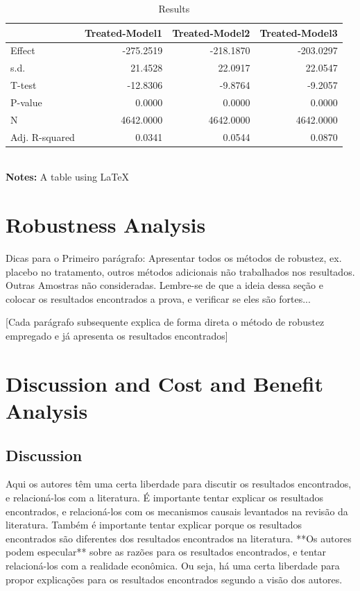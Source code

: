 \documentclass[a4paper]{article}
\begin{document}
\begin{table}[h]
\centering
      \caption{Results}
      \begin{tabular}{lrrr}
            \toprule
             & Treated-Model1 & Treated-Model2 & Treated-Model3 \\
             \midrule
             Effect & -275.2519 & -218.1870 & -203.0297 \\
             s.d. & 21.4528 & 22.0917 & 22.0547 \\
             T-test & -12.8306 & -9.8764 & -9.2057 \\
             P-value & 0.0000 & 0.0000 & 0.0000 \\
             N & 4642.0000 & 4642.0000 & 4642.0000 \\
             Adj. R-squared & 0.0341 & 0.0544 & 0.0870 \\
             \bottomrule
      \end{tabular} \\
\textbf{Notes:} A table using LaTeX
\end{table}


\section{Robustness Analysis}


Dicas para o Primeiro parágrafo: Apresentar todos os métodos de robustez, ex. placebo no tratamento, outros métodos adicionais não trabalhados nos resultados. Outras Amostras não consideradas. Lembre-se de que a ideia dessa seção e colocar os resultados encontrados a prova, e verificar se eles são fortes...

[Cada parágrafo subsequente explica de forma direta o método de robustez empregado e já apresenta os resultados encontrados]

\section{Discussion and Cost and Benefit Analysis}

\subsection{Discussion}

Aqui os autores têm uma certa liberdade para discutir os resultados encontrados, e relacioná-los com a literatura. É importante tentar explicar os resultados encontrados, e relacioná-los com os mecanismos causais levantados na revisão da literatura. Também é importante tentar explicar porque os resultados encontrados são diferentes dos resultados encontrados na literatura. **Os autores podem especular** sobre as razões para os resultados encontrados, e tentar relacioná-los com a realidade econômica. Ou seja, há uma certa liberdade para propor explicações para os resultados encontrados segundo a visão dos autores.
\end{document}
